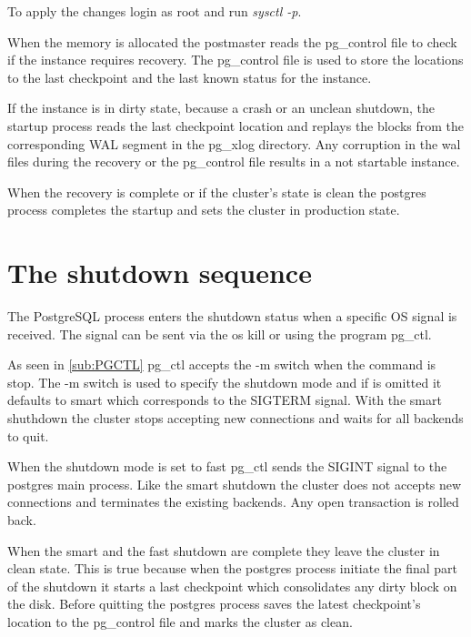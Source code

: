 To apply the changes login as root and run \textit{sysctl -p}.\newline


When the memory is allocated the postmaster reads the pg\_control file to check
if the instance requires recovery. The pg\_control file is used to store the
locations to the last checkpoint and the last known status for the
instance.\newline

If the instance is in dirty state, because a crash or an unclean shutdown, the
startup process reads the last checkpoint location and replays the blocks from
the corresponding WAL segment in the pg\_xlog directory. Any corruption in the
wal files during the recovery or the pg\_control file results in a not
startable instance.\newline

When the recovery is complete or if the cluster's state is clean the postgres
process completes the startup and sets the cluster in production state.

\section{The shutdown sequence}

\label{sec:SHUTDOWN_SEQ}


The PostgreSQL process enters the shutdown status when a specific OS signal is
received. The signal can be sent via the os kill or using the program pg\_ctl.
\newline

As seen in \ref{sub:PGCTL} pg\_ctl accepts the -m switch when the command is
stop. The -m switch is used to specify the shutdown mode and if is omitted it
defaults to smart which corresponds to the SIGTERM signal. With the smart
shuthdown the cluster stops accepting new connections and waits for all
backends to quit. \newline

When the shutdown mode is set to fast pg\_ctl sends the SIGINT signal to the
postgres main process. Like the smart shutdown the cluster does not accepts new
connections and terminates the existing backends. Any open transaction is
rolled back. \newline

When the smart and the fast shutdown are complete they leave the cluster in
clean state. This is true because when the postgres process initiate the final
part of the shutdown it starts a last checkpoint which consolidates any dirty
block on the disk. Before quitting the postgres process saves the latest
checkpoint's location to the pg\_control file and marks the cluster as
clean.\newline

